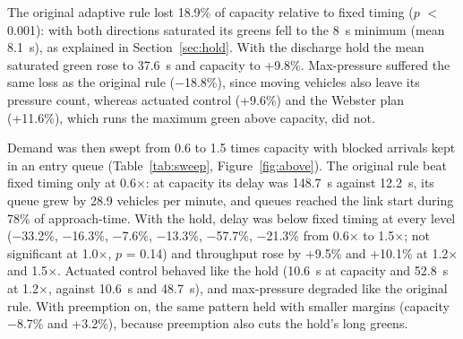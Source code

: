 \begin{table}[H]
\centering
\caption{Capacity of each controller (veh/h)}
\label{tab:capacity}
\small
{}
\par{}
\end{table}


The original adaptive rule lost 18.9\% of capacity relative to fixed timing ($p$ $<$ 0.001): with both directions saturated its greens fell to the 8~s minimum (mean 8.1~s), as explained in Section~\ref{sec:hold}. With the discharge hold the mean saturated green rose to 37.6~s and capacity to +9.8\%. Max-pressure suffered the same loss as the original rule ($-$18.8\%), since moving vehicles also leave its pressure count, whereas actuated control (+9.6\%) and the Webster plan (+11.6\%), which runs the maximum green above capacity, did not.

Demand was then swept from 0.6 to 1.5 times capacity with blocked arrivals kept in an entry queue (Table~\ref{tab:sweep}, Figure~\ref{fig:above}). The original rule beat fixed timing only at 0.6$\times$: at capacity its delay was 148.7~s against 12.2~s, its queue grew by 28.9 vehicles per minute, and queues reached the link start during 78\% of approach-time. With the hold, delay was below fixed timing at every level ($-$33.2\%, $-$16.3\%, $-$7.6\%, $-$13.3\%, $-$57.7\%, $-$21.3\% from 0.6$\times$ to 1.5$\times$; not significant at 1.0$\times$, $p$ = 0.14) and throughput rose by +9.5\% and +10.1\% at 1.2$\times$ and 1.5$\times$. Actuated control behaved like the hold (10.6~s at capacity and 52.8~s at 1.2$\times$, against 10.6~s and 48.7~s), and max-pressure degraded like the original rule. With preemption on, the same pattern held with smaller margins (capacity $-$8.7\% and +3.2\%), because preemption also cuts the hold's long greens.

